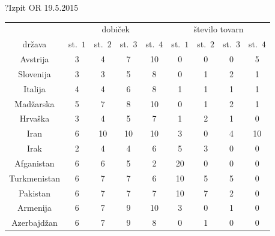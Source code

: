 \begin{naloga}{?}{Izpit OR 19.5.2015}
\begin{vprasanje}
\begin{tabela}
\begin{tabular}{c|cccc|cccc}
& \multicolumn{4}{|c|}{dobiček}
& \multicolumn{4}{c}{število tovarn} \\
država & st.~$1$ & st.~$2$ & st.~$3$ & st.~$4$
& st.~$1$ & st.~$2$ & st.~$3$ & st.~$4$ \\ \hline
Avstrija     & 3 &  4 &  7 & 10 &  0 & 0 & 0 &  5 \\
Slovenija    & 3 &  3 &  5 &  8 &  0 & 1 & 2 &  1 \\
Italija      & 4 &  4 &  6 &  8 &  1 & 1 & 1 &  1 \\
Madžarska    & 5 &  7 &  8 & 10 &  0 & 1 & 2 &  1 \\
Hrvaška      & 3 &  4 &  5 &  7 &  1 & 2 & 1 &  0 \\ \hline
Iran         & 6 & 10 & 10 & 10 &  3 & 0 & 4 & 10 \\
Irak         & 2 &  4 &  4 &  6 &  5 & 3 & 0 &  0 \\
Afganistan   & 6 &  6 &  5 &  2 & 20 & 0 & 0 &  0 \\
Turkmenistan & 6 &  7 &  7 &  6 & 10 & 5 & 5 &  0 \\
Pakistan     & 6 &  7 &  7 &  7 & 10 & 7 & 2 &  0 \\
Armenija     & 6 &  7 &  9 & 10 &  3 & 0 & 1 &  0 \\
Azerbajdžan  & 6 &  7 &  9 &  8 &  0 & 1 & 0 &  0 \\
\end{tabular}
\end{tabela}
\end{vprasanje}
\begin{odgovor}
\end{odgovor}
\end{naloga}


